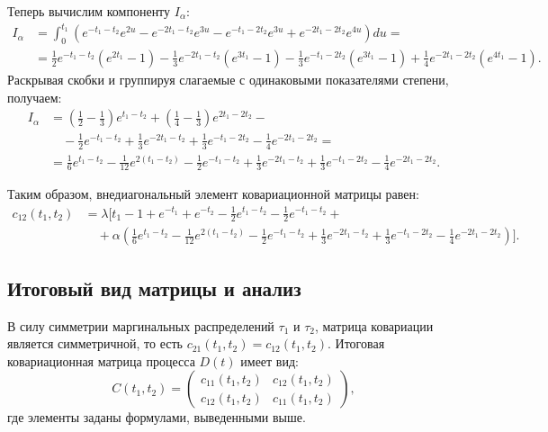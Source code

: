 \documentclass[12pt]{article}
\theoremstyle{plain}
\theoremstyle{definition}
\theoremstyle{remark}
\begin{document}
Теперь вычислим компоненту $I_\alpha$:
\begin{align*}
    I_\alpha &= \int_0^{t_1} \left( e^{-t_1-t_2}e^{2u} - e^{-2t_1-t_2}e^{3u} - e^{-t_1-2t_2}e^{3u} + e^{-2t_1-2t_2}e^{4u} \right) du = \\
    &= \frac{1}{2}e^{-t_1-t_2}(e^{2t_1}-1) - \frac{1}{3}e^{-2t_1-t_2}(e^{3t_1}-1) - \frac{1}{3}e^{-t_1-2t_2}(e^{3t_1}-1) + \frac{1}{4}e^{-2t_1-2t_2}(e^{4t_1}-1).
\end{align*}
Раскрывая скобки и группируя слагаемые с одинаковыми показателями степени, получаем:
\begin{align*}
    I_\alpha &= \left( \frac{1}{2} - \frac{1}{3} \right)e^{t_1-t_2} + \left( \frac{1}{4} - \frac{1}{3} \right)e^{2t_1-2t_2} - \\
    &\quad - \frac{1}{2}e^{-t_1-t_2} + \frac{1}{3}e^{-2t_1-t_2} + \frac{1}{3}e^{-t_1-2t_2} - \frac{1}{4}e^{-2t_1-2t_2} = \\
    &= \frac{1}{6}e^{t_1-t_2} - \frac{1}{12}e^{2(t_1-t_2)} - \frac{1}{2}e^{-t_1-t_2} + \frac{1}{3}e^{-2t_1-t_2} + \frac{1}{3}e^{-t_1-2t_2} - \frac{1}{4}e^{-2t_1-2t_2}.
\end{align*}

Таким образом, внедиагональный элемент ковариационной матрицы равен:
\begin{align}
    c_{12}(t_1, t_2) &= \lambda \Bigg[ t_1 - 1 + e^{-t_1} + e^{-t_2} - \frac{1}{2}e^{t_1-t_2} - \frac{1}{2}e^{-t_1-t_2} + \nonumber \\
    &\quad + \alpha \left( \frac{1}{6}e^{t_1-t_2} - \frac{1}{12}e^{2(t_1-t_2)} - \frac{1}{2}e^{-t_1-t_2} + \frac{1}{3}e^{-2t_1-t_2} + \frac{1}{3}e^{-t_1-2t_2} - \frac{1}{4}e^{-2t_1-2t_2} \right) \Bigg]. \label{eq:cov_matrix_offdiag}
\end{align}

\subsection{Итоговый вид матрицы и анализ}
В силу симметрии маргинальных распределений $\tau_1$ и $\tau_2$, матрица ковариации является симметричной, то есть $c_{21}(t_1, t_2) = c_{12}(t_1, t_2)$. Итоговая ковариационная матрица процесса $D(t)$ имеет вид:
\begin{equation}
    C(t_1, t_2) = 
    \begin{pmatrix}
        c_{11}(t_1, t_2) & c_{12}(t_1, t_2) \\
        c_{12}(t_1, t_2) & c_{11}(t_1, t_2)
    \end{pmatrix},
\end{equation}
где элементы заданы формулами, выведенными выше.
\end{document}
